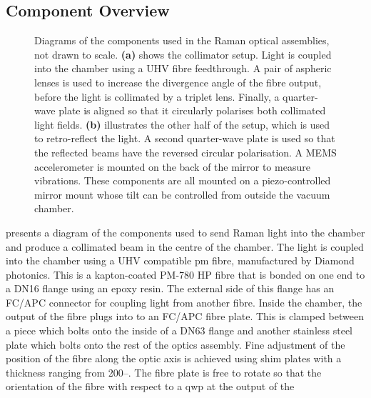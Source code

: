 \subsection{Component Overview}\label{subsec:setup_ramancollimator}
\begin{figure}[!htbp]
	\centering
	\def\svgwidth{\columnwidth}
  \fontsize{18pt}{18pt}
  \subfloat[][]{\raisebox{.4\height}{\scalebox{0.4}{\label{fig:raman_collimator}}}}\quad
	\subfloat[][]{\scalebox{0.4}{\label{fig:mirror_mount}}}
	\caption[Drawings of the componets used in the Raman optics
		assemblies]{Diagrams of the components used in the Raman optical
      assemblies, not drawn to scale.
      \textbf{(a)} shows the collimator setup. Light is coupled into the chamber using a
		UHV fibre feedthrough. A pair of aspheric lenses is used to increase the
		divergence angle of the fibre output, before the light is collimated by a
		triplet lens. Finally, a quarter-wave plate is aligned so that it circularly
    polarises both collimated light fields. \textbf{(b)} illustrates the other half of the
		setup, which is used to retro-reflect the light. A second quarter-wave plate
		is used so that the reflected beams have the reversed circular
    polarisation. A MEMS accelerometer is mounted on the back of the
		mirror to measure vibrations. These components are all mounted on a
		piezo-controlled mirror mount whose tilt can be controlled from outside the
		vacuum chamber.}
	\label{fig:raman_optics}
\end{figure}
 presents a diagram of the components used to
send Raman light into the chamber and produce a collimated beam in the centre of
the chamber. The light is coupled into the chamber using a UHV compatible
\ac{pm} fibre, manufactured by Diamond photonics. This is a kapton-coated PM-780
HP fibre that is bonded on one end to a DN16 flange using an epoxy resin. The
external side of this flange has an FC/APC connector for coupling light from
another fibre. Inside the chamber, the output of the fibre plugs into to an FC/APC fibre
plate. This is clamped between a piece which bolts onto the inside of a DN63
flange and another stainless steel plate which bolts onto the rest of the optics
assembly. Fine adjustment of the position of the fibre along the optic axis is
achieved using shim plates with a thickness ranging from
200--. The fibre plate is free to rotate so that the
orientation of the fibre with respect to a \ac{qwp} at the output of the
